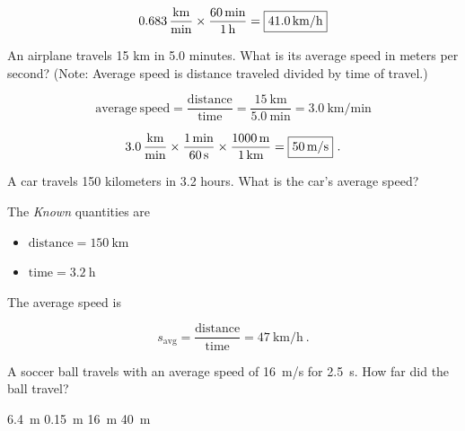 \documentclass[]{exam}
\begin{document}
\begin{questions}
\begin{solution}
\begin{equation*}
    \SI[per-mode=fraction]{0.683}{\kilo\meter\per\minute} \times \frac{\SI{60}{\min}}{\SI{1}{\hour}} = \framebox{\SI{41.0}{\kilo\meter/\hour}}
\end{equation*}
\end{solution}

\question
An airplane travels 15 km in 5.0 minutes. What is its average speed in meters per second? (Note: Average speed is distance traveled divided by time of travel.)

\begin{solution}
\begin{equation*}
    \mathrm{average\ speed = \frac{distance}{time}} = \frac{\SI{15}{\kilo\meter}}{\SI{5.0}{\minute}} = \SI[per-mode=fraction]{3.0}{\kilo\meter\per\minute}
\end{equation*}

\begin{equation*}
    \SI[per-mode=fraction]{3.0}{\kilo\meter\per\minute} \times \frac{\SI{1}{\minute}}{\SI{60}{\second}} \times \frac{\SI{1000}{\meter}}{\SI{1}{\kilo\meter}} = \framebox{\SI{50}{\meter/\second}}\ .
\end{equation*}
\end{solution}


\question
A car travels 150 kilometers in 3.2 hours. What is the car's average speed?

\begin{solution}
The \textit{Known} quantities are

\begin{itemize}
    \item $\mathrm{distance} = \SI{150}{\km}$
    \item $\mathrm{time} = \SI{3.2}{\hour}$
\end{itemize}

The average speed is

\begin{equation*}
    s_{\mathrm{avg}} = \mathrm{\frac{distance}{time}} = \SI[per-mode=symbol]{47}{\km\per\hour}\ .
\end{equation*}
\end{solution}

\question
A soccer ball travels with an average speed of \SI{16}{m/s} for \SI{2.5}{s}. How far did the ball travel?

\begin{choices}
    \choice \SI{6.4}{m}
    \choice \SI{0.15}{m}
    \choice \SI{16}{m}
    \correctchoice \SI{40}{m}
\end{choices}


\end{questions}
\end{document}
